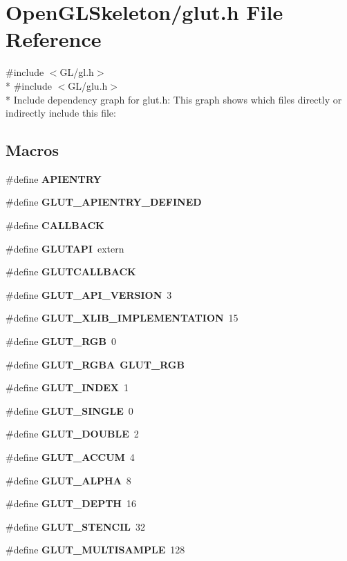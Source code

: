 \section{Open\+G\+L\+Skeleton/glut.h File Reference}
\label{glut_8h}
{\ttfamily \#include $<$G\+L/gl.\+h$>$}\\*
{\ttfamily \#include $<$G\+L/glu.\+h$>$}\\*
Include dependency graph for glut.\+h\+:
This graph shows which files directly or indirectly include this file\+:
\subsection*{Macros}
\begin{DoxyCompactItemize}
\item 
\#define {\bf A\+P\+I\+E\+N\+T\+RY}
\item 
\#define {\bf G\+L\+U\+T\+\_\+\+A\+P\+I\+E\+N\+T\+R\+Y\+\_\+\+D\+E\+F\+I\+N\+ED}
\item 
\#define {\bf C\+A\+L\+L\+B\+A\+CK}
\item 
\#define {\bf G\+L\+U\+T\+A\+PI}~extern
\item 
\#define {\bf G\+L\+U\+T\+C\+A\+L\+L\+B\+A\+CK}
\item 
\#define {\bf G\+L\+U\+T\+\_\+\+A\+P\+I\+\_\+\+V\+E\+R\+S\+I\+ON}~3
\item 
\#define {\bf G\+L\+U\+T\+\_\+\+X\+L\+I\+B\+\_\+\+I\+M\+P\+L\+E\+M\+E\+N\+T\+A\+T\+I\+ON}~15
\item 
\#define {\bf G\+L\+U\+T\+\_\+\+R\+GB}~0
\item 
\#define {\bf G\+L\+U\+T\+\_\+\+R\+G\+BA}~{\bf G\+L\+U\+T\+\_\+\+R\+GB}
\item 
\#define {\bf G\+L\+U\+T\+\_\+\+I\+N\+D\+EX}~1
\item 
\#define {\bf G\+L\+U\+T\+\_\+\+S\+I\+N\+G\+LE}~0
\item 
\#define {\bf G\+L\+U\+T\+\_\+\+D\+O\+U\+B\+LE}~2
\item 
\#define {\bf G\+L\+U\+T\+\_\+\+A\+C\+C\+UM}~4
\item 
\#define {\bf G\+L\+U\+T\+\_\+\+A\+L\+P\+HA}~8
\item 
\#define {\bf G\+L\+U\+T\+\_\+\+D\+E\+P\+TH}~16
\item 
\#define {\bf G\+L\+U\+T\+\_\+\+S\+T\+E\+N\+C\+IL}~32
\item 
\#define {\bf G\+L\+U\+T\+\_\+\+M\+U\+L\+T\+I\+S\+A\+M\+P\+LE}~128
\item 

\end{DoxyCompactItemize}
